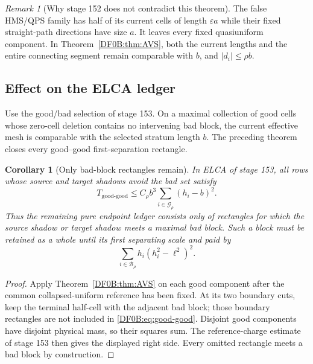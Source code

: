 \documentclass[11pt]{amsart}
\numberwithin{equation}{section}
\newtheorem{corollary}[theorem]{Corollary}
\theoremstyle{definition}
\theoremstyle{remark}
\newtheorem{remark}[theorem]{Remark}
\begin{document}
\begin{remark}[Why stage 152 does not contradict this theorem]
The false HMS/QPS family has half of its current cells of length
$\varepsilon a$ while their fixed straight-path directions have size
$a$.  It leaves every fixed quasiuniform component.  In
Theorem~\ref{DF0B:thm:AVS}, both the current lengths and the entire connecting
segment remain comparable with $b$, and $|d_i|\le\rho b$.
\end{remark}

\subsection{Effect on the ELCA ledger}

Use the good/bad selection of stage 153.  On a maximal collection of
good cells whose zero-cell deletion contains no intervening bad block,
the current effective mesh is comparable with the selected stratum
length $b$.  The preceding theorem closes every good--good
first-separation rectangle.

\begin{corollary}[Only bad-block rectangles remain]
\label{DF0B:cor:remaining}
In ELCA of stage 153, all rows whose source and target shadows avoid the
bad set satisfy
\begin{equation}\label{DF0B:eq:good-good}
 T_{\mathrm{good\text{-}good}}
 \le C_\rho b^3\sum_{i\in\mathcal G_\rho}(h_i-b)^2.
\end{equation}
Thus the remaining pure endpoint ledger consists only of rectangles for
which the source shadow or target shadow meets a maximal bad block.  Such
a block must be retained as a whole until its first separating scale and
paid by
\begin{equation}\label{DF0B:eq:bad-charge}
 \sum_{i\in\mathcal B_\rho}h_i(h_i^2-\ell^2)^2.
\end{equation}
\end{corollary}

\begin{proof}
Apply Theorem~\ref{DF0B:thm:AVS} on each good component after the common
collapsed-uniform reference has been fixed.  At its two boundary cuts,
keep the terminal half-cell with the adjacent bad block; those boundary
rectangles are not included in \eqref{DF0B:eq:good-good}.  Disjoint good
components have disjoint physical mass, so their squares sum.  The
reference-charge estimate of stage 153 then gives the displayed right
side.  Every omitted rectangle meets a bad block by construction.
\end{proof}
\endgroup
\end{document}
